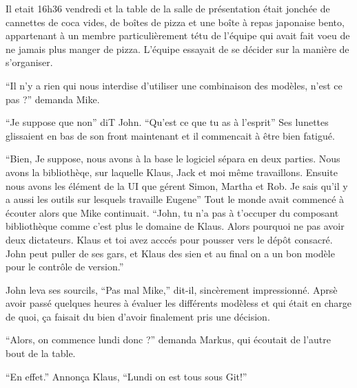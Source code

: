 \begin{trenches}
Il etait 16h36 vendredi et la table de la salle de présentation était jonchée de cannettes de coca vides, de boîtes de pizza et une boîte à repas japonaise bento, appartenant à un membre particulièrement tétu de l'équipe qui avait fait voeu de ne jamais plus manger de pizza.
L'équipe essayait de se décider sur la manière de s'organiser.

``Il n'y a rien qui nous interdise d'utiliser une combinaison des modèles, n'est ce pas ?'' demanda Mike.

``Je suppose que non'' diT John.
``Qu'est ce que tu as à l'esprit'' Ses lunettes glissaient en bas de son front maintenant et il commencait à être bien fatigué.

``Bien, Je suppose, nous avons à la base le logiciel sépara en deux parties. Nous avons la bibliothèqe, sur laquelle Klaus, Jack et moi même travaillons. Ensuite nous avons les élément de la UI que gérent Simon, Martha et Rob. Je sais qu'il y a aussi les outils sur lesquels travaille Eugene''
Tout le monde avait commencé à écouter alors que Mike continuait.
``John, tu n'a pas à t'occuper du composant bibliothèque comme c'est plus le domaine de Klaus. Alors pourquoi ne pas avoir deux dictateurs. Klaus et toi avez acccés pour pousser vers le dépôt consacré. John peut puller de ses gars, et Klaus des sien et au final on a un bon modèle pour le contrôle de version.''

John leva ses sourcils, ``Pas mal Mike,'' dit-il, sincèrement impressionné.
Aprsè avoir passé quelques heures à évaluer les différents modèless et qui était en charge de quoi, ça faisait du bien d'avoir finalement pris une décision.

``Alors, on commence lundi donc ?'' demanda Markus, qui écoutait de l'autre bout de la table.

``En effet.'' Annonça Klaus, ``Lundi on est tous sous Git!''
\end{trenches}
